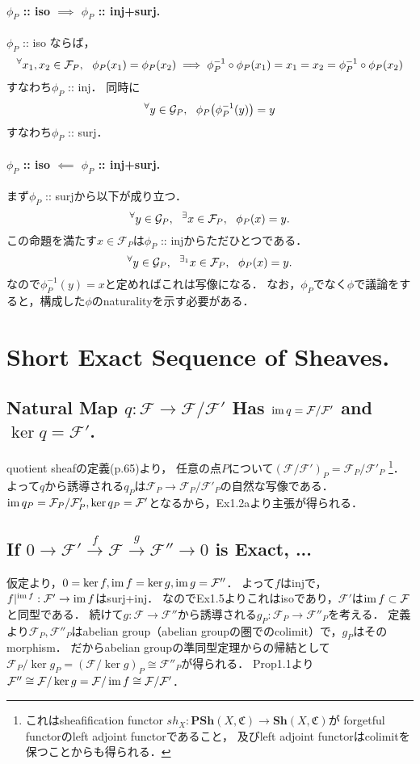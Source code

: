 \documentclass[a4paper]{jsarticle}
\newcommand{\shF}{\mathcal{F}}
\newcommand{\shG}{\mathcal{G}}
\begin{document}
    \paragraph{$\phi_P$ :: iso $\implies$ $\phi_P$ :: inj+surj.}
    $\phi_P$ :: iso ならば，
    \[
        \Forall{x_1, x_2 \in \shF_P}
        \phi_P(x_1)=\phi_P(x_2)
        \implies
        \phi_P^{-1} \circ \phi_P(x_1)=x_1=x_2=\phi_P^{-1} \circ \phi_P(x_2)
        \label{prop:ex15-inj}
    \]
    すなわち$\phi_P$ :: inj．
    同時に
    \[ \Forall{y \in \shG_P} \phi_P \big( \phi_P^{-1}(y) \big)=y \]
    すなわち$\phi_P$ :: surj．

    \paragraph{$\phi_P$ :: iso $\impliedby$ $\phi_P$ :: inj+surj.}
    まず$\phi_P$ :: surjから以下が成り立つ．
    \[ \Forall{y \in \shG_P} \Exists{x \in \shF_P} \phi_P(x)=y. \]
    この命題を満たす$x \in \shF_P$は$\phi_P$ :: injからただひとつである．
    \[ \Forall{y \in \shG_P} {}^{\exists_1} x \in \shF_P,~~ \phi_P(x)=y. \]
    なので$\phi_P^{-1}(y)=x$と定めればこれは写像になる．
    なお，$\phi_P$でなく$\phi$で議論をすると，構成した$\phi$のnaturalityを示す必要がある．

\section{Short Exact Sequence of Sheaves.} %
    \subsection{Natural Map $q:\shF \to \shF/\shF'$ Has $\im q=\shF/\shF'$ and $\ker q=\shF'$.}
    quotient sheafの定義(p.65)より，
    任意の点$P$について$(\shF/\shF')_P=\shF_P/\shF'_P$
    \footnote
    {
        これはsheafification functor $sh_X: \mathbf{PSh}(X, \mathfrak{C}) \to \mathbf{Sh}(X, \mathfrak{C})$が
        forgetful functorのleft adjoint functorであること，
        及びleft adjoint functorはcolimitを保つことからも得られる．
    }．
    よって$q$から誘導される$q_P$は$\shF_P \to \shF_P/\shF'_P$の自然な写像である．
    $\im q_P=\shF_P/\shF'_P, \ker q_P=\shF'$となるから，Ex1.2aより主張が得られる．

    \subsection{If $0 \to \shF' \xrightarrow{f} \shF \xrightarrow{g} \shF'' \to 0$ is Exact, ...}
    仮定より，$0=\ker f, \im f=\ker g, \im g=\shF''$．
    よって$f$はinjで，$f|^{\im f}: \shF' \to \im f$はsurj+inj．
    なのでEx1.5よりこれはisoであり，$\shF'$は$\im f \subset \shF$と同型である．
    続けて$g:\shF \to \shF''$から誘導される$g_P: \shF_P \to \shF''_P$を考える．
    定義より$\shF_P, \shF''_P$はabelian group（abelian groupの圏でのcolimit）で，$g_P$はそのmorphism．
    だからabelian groupの準同型定理からの帰結として$\shF_P/\ker g_P=(\shF/\ker g)_P \cong \shF''_P$が得られる．
    Prop1.1より$\shF'' \cong \shF/\ker g=\shF/\im f \cong \shF/\shF'$．
\end{document}
